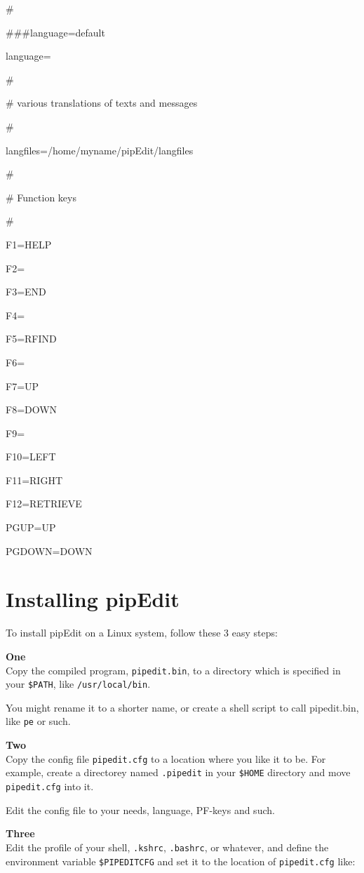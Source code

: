 \documentclass{report}
\begin{document}
\#

\#\#\#language=default

language=

\#

\# various translations of texts and messages

\#

langfiles=/home/myname/pipEdit/langfiles

\#

\# Function keys

\#

F1=HELP

F2=

F3=END

F4=

F5=RFIND

F6=

F7=UP

F8=DOWN

F9=

F10=LEFT

F11=RIGHT

F12=RETRIEVE

PGUP=UP

PGDOWN=DOWN

\chapter{Installing pipEdit}
To install pipEdit on a Linux system, follow these 3 easy steps: \\
\break

\textbf{One} \\
Copy the compiled program, \texttt{pipedit.bin}, to a directory which is 
specified in your \texttt{\$PATH}, like \texttt{/usr/local/bin}.

You might rename it to a shorter name, or create a shell script to call pipedit.bin, like \texttt{pe} or such. \\
\break

\textbf{Two} \\
Copy the config file \texttt{pipedit.cfg} to a location where you like it to be.
For example, create a directorey named \texttt{.pipedit} in your 
\texttt{\$HOME} directory and move \texttt{pipedit.cfg} into it.

Edit the config file to your needs, language, PF-keys and such.
\\
\break

\textbf{Three} \\
Edit the profile of your shell, \texttt{.kshrc}, \texttt{.bashrc}, or whatever, 
and define
the environment variable \texttt{\$PIPEDITCFG} and set it to the location of
\texttt{pipedit.cfg} like:
\end{document}
